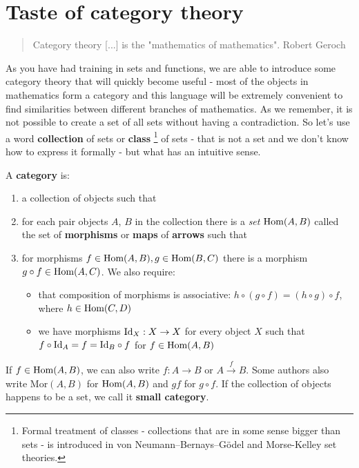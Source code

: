 \chapter{Taste of category theory}

\begin{quote}
  Category theory [...] is the "mathematics of mathematics".
  Robert Geroch
\end{quote}

As you have had training in sets and functions, we are able to introduce some category theory that will quickly become useful - most of the objects in mathematics form a
category and this language will be extremely convenient to find similarities between different branches of mathematics.
As we remember, it is not possible to create a set of all sets without having a contradiction. So let's use a word \textbf{collection} of sets or \textbf{class}
\footnote{Formal treatment of classes - collections that are in some sense bigger than sets - is introduced in von Neumann–Bernays–Gödel and Morse-Kelley set theories.}
 of sets - that is not a set and we don't know how to express it formally - but what has an intuitive sense.

\begin{definition}
  A \textbf{category} is:
  \begin{enumerate}
    \item a collection of objects such that
    \item for each pair objects $A$, $B$ in the collection there is a \emph{set} $\text{Hom}(A,B)$ called the set of \textbf{morphisms} or \textbf{maps} of \textbf{arrows} such that
    \item for morphisms $f\in \text{Hom}(A,B), g\in \text{Hom}(B,C)$ there is a morphism $g\circ f\in \text{Hom}(A,C)$. We also require:
      \begin{itemize}
        \item that composition of morphisms is associative: $h\circ(g\circ f)=(h\circ g)\circ f$, where $h\in \text{Hom}(C, D)$
        \item we have morphisms $\text{Id}_X: X\to X$ for every object $X$ such that $f\circ\text{Id}_A = f=\text{Id}_B\circ f$ for $f\in \text{Hom}(A,B)$
      \end{itemize}
  \end{enumerate}
  If $f\in \text{Hom}(A,B)$, we can also write $f:A\to B$ or $A\xrightarrow{f} B$. Some authors also write $\text{Mor}(A,B)$ for $\text{Hom}(A,B)$ and $gf$ for $g\circ f$. If the collection of objects happens
  to be a set, we call it \textbf{small category}.
\end{definition}

